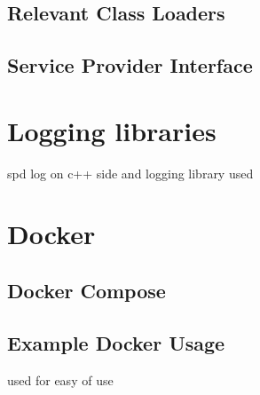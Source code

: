 \subsection{Relevant Class Loaders}
\subsection{Service Provider Interface}

\section{Logging libraries}
spd log on c++ side and 
logging library used
\section{Docker}
\subsection{Docker Compose}
\subsection{Example Docker Usage}
used for easy of use
